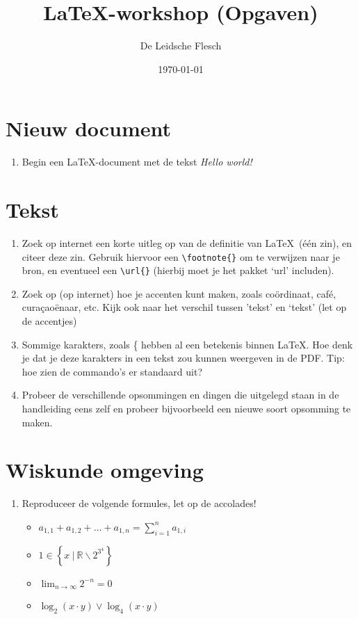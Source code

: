\documentclass{article}
\begin{document}
\title{\LaTeX-workshop (Opgaven)}
\author{De Leidsche Flesch}
\date{\today}

\maketitle

\section{Nieuw document}
	\begin{enumerate}
		\item Begin een \LaTeX-document met de tekst \emph{Hello world!}
	\end{enumerate}
	
\section{Tekst}
	\begin{enumerate}
		\item Zoek op internet een korte uitleg op van de definitie van \LaTeX\ (\'e\'en zin), en citeer deze zin. Gebruik hiervoor een \verb+\footnote{}+ om te verwijzen naar je bron, en eventueel een \verb+\url{}+ (hierbij moet je het pakket `url' includen).
		\item Zoek op (op internet) hoe je accenten kunt maken, zoals co\"ordinaat, caf\'e, cura\c{c}ao\"enaar, etc. Kijk ook naar het verschil tussen 'tekst' en `tekst' (let op de accentjes)
		\item Sommige karakters, zoals \{ hebben al een betekenis binnen \LaTeX. Hoe denk je dat je deze karakters in een tekst zou kunnen weergeven in de PDF. Tip: hoe zien de commando's er standaard uit?
		\item Probeer de verschillende opsommingen en dingen die uitgelegd staan in de handleiding eens zelf en probeer bijvoorbeeld een nieuwe soort opsomming te maken.
	\end{enumerate}


\section{Wiskunde omgeving}
\begin{enumerate}
	\item Reproduceer de volgende formules, let op de accolades!
	\begin{itemize}
		\renewcommand{\labelitemi}{\(\circ\)}
			\item\(a_{1,1} + a_{1,2} + \ldots + a_{1,n} = \displaystyle\sum_{i = 1}^n a_{1,i}\)\\
			\item\( 1 \in \left\{ x~|~\mathbb{R} \backslash 2^{3^4} \right\}\)\\
			\item\(\displaystyle\lim_{n \to \infty} 2^{-n} = 0\)\\
			\item\(\log_2(x\cdot y) \lor \log_4(x\cdot y)\)
		\end{itemize}
		
\end{enumerate}
\end{document}
